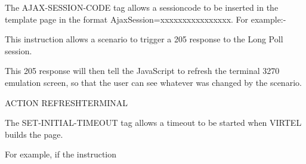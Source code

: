 \documentclass[letterpaper,10pt,english]{sphinxmanual}
\begin{document}
The AJAX-SESSION-CODE tag allows a sessioncode to be inserted in the template page in the format AjaxSession=xxxxxxxxxxxxxxxx. For example:-

\begin{sphinxVerbatim}[commandchars=\\\{\}]
  
\end{sphinxVerbatim}


This instruction allows a scenario to trigger a 205 response to the Long Poll session.

This 205 response will then tell the JavaScript to refresh the terminal 3270 emulation screen, so that the user can see whatever was changed by the scenario.

\begin{sphinxVerbatim}[commandchars=\\\{\}]
ACTION\PYGZdl{} REFRESH\PYGZhy{}TERMINAL
\end{sphinxVerbatim}


The SET-INITIAL-TIMEOUT tag allows a timeout to be started when VIRTEL builds the page.

\begin{sphinxVerbatim}[commandchars=\\\{\}]
   
\end{sphinxVerbatim}

For example, if the instruction

\begin{sphinxVerbatim}[commandchars=\\\{\}]
   
\end{sphinxVerbatim}
\end{document}

